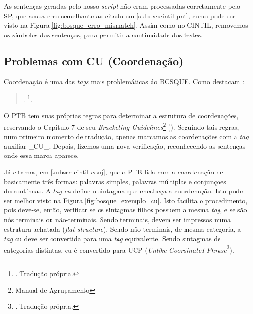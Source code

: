 As sentenças geradas pelo nosso \textit{script} não eram processadas corretamente pelo SP, que acusa erro semelhante ao citado em \ref{subsec:cintil-pnt}, como pode ser visto na Figura \ref{fig:bosque_erro_mismatch}. Assim como no CINTIL, removemos os símbolos das sentenças, para permitir a continuidade dos testes.
\begin{center}
    
\end{center}
\subsection{Problemas com CU (Coordenação)}
\label{subsec:cu}
Coordenação é uma das \textit{tags} mais problemáticas do BOSQUE. Como destacam :
\begin{quote}
    .
    \footnote{. Tradução própria.}.
\end{quote}
O PTB tem suas próprias regras para determinar a estrutura de coordenações, reservando o Capítulo 7 de seu \textit{Bracketing Guidelines}\footnote{Manual de Agrupamento} (\cite[p~117]{bracketing_ptb}). Seguindo tais regras, num primeiro momento de tradução, apenas marcamos as coordenações com a \textit{tag} auxiliar \_CU\_. Depois, fizemos uma nova verificação, reconhecendo as sentenças onde essa marca aparece.
\begin{center}
    
\end{center}
Já citamos, em \ref{subsec-cintil-conj}, que o PTB lida com a coordenação de basicamente três formas: palavras simples, palavras múltiplas e conjunções descontínuas. A \textit{tag} \textit{cu} define o sintagma que encabeça a coordenação. Isto pode ser melhor visto na Figura \ref{fig:bosque_exemplo_cu}. Isto facilita o procedimento, pois deve-se, então, verificar se os sintagmas filhos possuem a mesma \textit{tag}, e se são nós terminais ou não-terminais. Sendo terminais, devem ser impressos numa estrutura achatada (\textit{flat structure}). Sendo não-terminais, de mesma categoria, a \textit{tag} cu deve ser convertida para uma \textit{tag} equivalente. Sendo sintagmas de categorias distintas, cu é convertido para UCP (\textit{Unlike Coordinated Phrase}\footnote{. Tradução própria.}).
